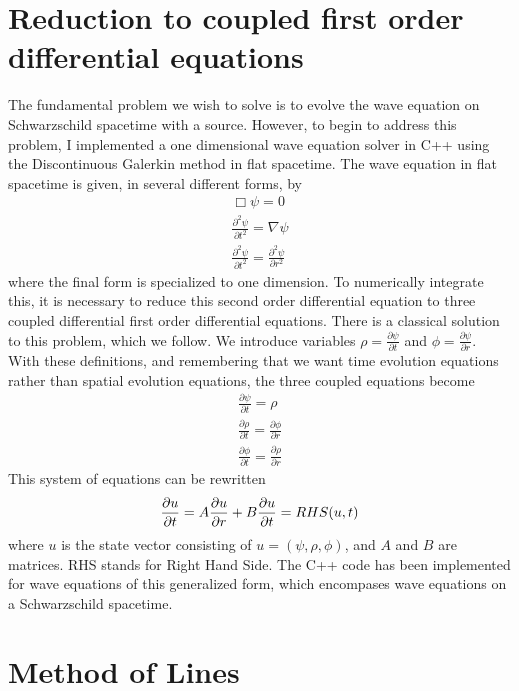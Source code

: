 \section{Reduction to coupled first order differential equations}


The fundamental problem we wish to solve is to evolve the wave equation on Schwarzschild spacetime with a source. However, to begin to address this problem, I implemented a one dimensional wave equation solver in C++ using the Discontinuous Galerkin method in flat spacetime. The wave equation in flat spacetime is given, in several different forms, by
\begin{eqnarray}
  \Box\psi=0\\
  \frac{\partial^2\psi}{\partial t^2}=\nabla\psi\\
  \frac{\partial^2\psi}{\partial t^2}=\frac{\partial^2 \psi}{\partial r^2}
\end{eqnarray}
where the final form is specialized to one dimension. To numerically integrate this, it is necessary to reduce this second order differential equation to three coupled differential first order differential equations. There is a classical solution to this problem, which we follow. We introduce variables $\rho=\frac{\partial \psi}{\partial t}$ and $\phi = \frac{\partial\psi}{\partial r}$. With these definitions, and remembering that we want time evolution equations rather than spatial evolution equations, the three coupled equations become
\begin{eqnarray}
  \frac{\partial\psi}{\partial t} = \rho\\
  \frac{\partial\rho}{\partial t} = \frac{\partial \phi}{\partial r}\\
  \frac{\partial\phi}{\partial t} = \frac{\partial \rho}{\partial r}
\end{eqnarray}
This system of equations can be rewritten
\begin{equation}
  \frac{\partial u}{\partial t} = A\frac{\partial u}{\partial r} + B\nonumber\\
  \frac{\partial u}{\partial t} = RHS(u,t)
  \label{matrixdiff}
\end{equation}
where $u$ is the state vector consisting of $u=(\psi,\rho,\phi)$, and $A$ and $B$ are matrices. RHS stands for Right Hand Side. The C++ code has been implemented for wave equations of this generalized form, which encompases wave equations on a Schwarzschild spacetime.


\section{Method of Lines}

